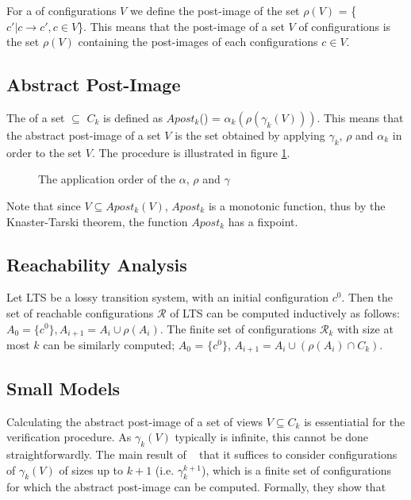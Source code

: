 For a  of configurations $V$ we define the post-image of the set $\rho(V)$ = \{$c' | c \rightarrow c', c \in V$\}. This means that the post-image of a set $V$ of configurations is the set $\rho(V)$ containing the post-images of each configurations $c\in V$.

\subsection{Abstract Post-Image}
The  of a set  $\subseteq$ $C_k$ is defined as $Apost_k$() = $\alpha_k(\rho(\gamma_k(V)))$. This means that the abstract post-image of a set $V$ is the set obtained by applying $\gamma_k$, $\rho$ and $\alpha_k$ in order to the set $V$. The procedure is illustrated in figure \ref{apost}.
\begin{figure}
\abstraction
\caption{The application order of the $\alpha$, $\rho$ and $\gamma$}
\label{apost}
\end{figure}

Note that since $V \subseteq Apost_k(V)$, $Apost_k$ is a monotonic function, thus by the Knaster-Tarski theorem, the function $Apost_k$ has a fixpoint.

\subsection{Reachability Analysis}
\label{reachcompute}
Let LTS be a lossy transition system, with an initial configuration $c^0$. Then the set of reachable configurations $\mathcal{R}$ of LTS can be computed inductively as follows: $A_0 = \{c^0\}, A_{i+1}= A_i \cup \rho(A_i)$. The finite set of configurations $\mathcal{R}_k$ with size at most $k$ can be similarly computed; $A_0$ = $\{c^0\}$, $A_{i+1} = A_i \cup (\rho(A_i) \cap C_k)$.

\subsection{Small Models}
\label{proof}
Calculating the abstract post-image of a set of views $V \subseteq C_k$ is essentiatial for the verification procedure. As $\gamma_k(V)$ typically is infinite, this cannot be done straightforwardly. The main result of ~\cite{parosh} that it suffices to consider configurations of $\gamma_k(V)$ of sizes up to $k+1$ (i.e. $\gamma_k^{k+1}$), which is a finite set of configurations for which the abstract post-image can be computed. Formally, they show that


